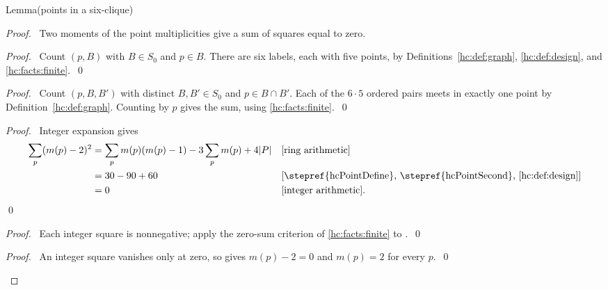 \begin{mergedproofsection}
\begin{namedresult}{Lemma}{(points in a six-clique)}\label{hc:lem:point-clique}
 \leavevmode\par
\end{namedresult}
\begin{proof}
 \pfsketch\ Two moments of the point multiplicities give a sum
 of squares equal to zero.
 \begin{proof}\pf\ Count $(p,B)$ with $B\in S_0$ and $p\in B$.
  There are six labels, each with five points, by
  Definitions~\ref{hc:def:graph}, \ref{hc:def:design}, and
  \ref{hc:facts:finite}.~\qed\end{proof}
 \begin{proof}\pf\ Count $(p,B,B')$ with distinct $B,B'\in S_0$
  and $p\in B\cap B'$. Each of the $6\cdot5$ ordered pairs
  meets in exactly one point by Definition~\ref{hc:def:graph}.
  Counting by $p$ gives the sum, using \ref{hc:facts:finite}.~\qed\end{proof}
 \begin{proof}
  \pf\ Integer expansion gives
  \begin{align*}
   \sum_p(m(p)-2)^2
    &=\sum_p m(p)(m(p)-1)-3\sum_p m(p)+4|P|
        &&\text{[ring arithmetic]}\\
    &=30-90+60 &&\text{[\stepref{hcPointDefine}, \stepref{hcPointSecond},
                           \ref{hc:def:design}]}\\
    &=0 &&\text{[integer arithmetic].}
  \end{align*}\qed
 \end{proof}
 \begin{proof}\pf\ Each integer square is nonnegative; apply the
  zero-sum criterion of \ref{hc:facts:finite} to .~\qed\end{proof}
 \qedstep
 \begin{proof}\pf\ An integer square vanishes only at zero, so
   gives $m(p)-2=0$ and $m(p)=2$ for every $p$.~\qed\end{proof}
\end{proof}


\end{mergedproofsection}
